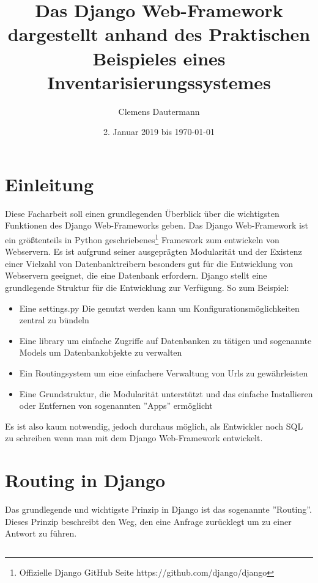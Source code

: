 \documentclass{article}
\title{Das Django Web-Framework dargestellt anhand des Praktischen Beispieles eines Inventarisierungssystemes}
\author{Clemens Dautermann}
\date{2. Januar 2019 bis \today}
\begin{document}
\maketitle
\newpage
\tableofcontents
\newpage


\section{Einleitung}
Diese Facharbeit soll einen grundlegenden Überblick über die wichtigsten Funktionen des Django Web-Frameworks geben.\newline
Das Django Web-Framework ist ein größtenteils in Python geschriebenes\footnote{Offizielle Django GitHub Seite https://github.com/django/django} Framework
zum entwickeln von Webservern. Es ist aufgrund seiner ausgeprägten Modularität und der Existenz einer Vielzahl von Datenbanktreibern besonders gut für
die Entwicklung von Webservern geeignet, die eine Datenbank erfordern.\newline 
Django stellt eine grundlegende Struktur für die Entwicklung zur Verfügung. So zum Beispiel:
\begin{itemize}
	\item Eine settings.py Die genutzt werden kann um Konfigurationsmöglichkeiten zentral zu bündeln
	\item Eine library um einfache Zugriffe auf Datenbanken zu tätigen und sogenannte Models um Datenbankobjekte zu verwalten
	\item Ein Routingsystem um eine einfachere Verwaltung von Urls zu gewährleisten
	\item Eine Grundstruktur, die Modularität unterstützt und das einfache Installieren oder Entfernen von sogenannten ''Apps'' ermöglicht
\end{itemize}
Es ist also kaum notwendig, jedoch durchaus möglich, als Entwickler noch SQL zu schreiben wenn man mit dem Django Web-Framework entwickelt.
\section{Routing in Django}
Das grundlegende und wichtigste Prinzip in Django ist das sogenannte ''Routing''. Dieses Prinzip beschreibt den Weg, den eine Anfrage zurücklegt um zu einer Antwort zu führen. 
\subsection{}
\end{document}
